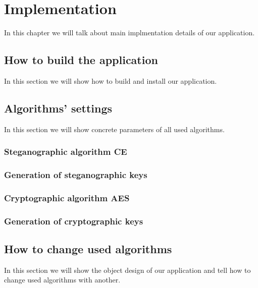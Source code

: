 \chapter{Implementation}

In this chapter we will talk about main implmentation details of
our application.

\section{How to build the application}
In this section we will show how to build and install our application.

\section{Algorithms' settings}
In this section we will show concrete parameters of all used algorithms.

\subsection{Steganographic algorithm CE}
\subsection{Generation of steganographic keys}
\subsection{Cryptographic algorithm AES}
\subsection{Generation of cryptographic keys}

\section{How to change used algorithms}
In this section we will show the object design of our application
and tell how to change used algorithms with another.
